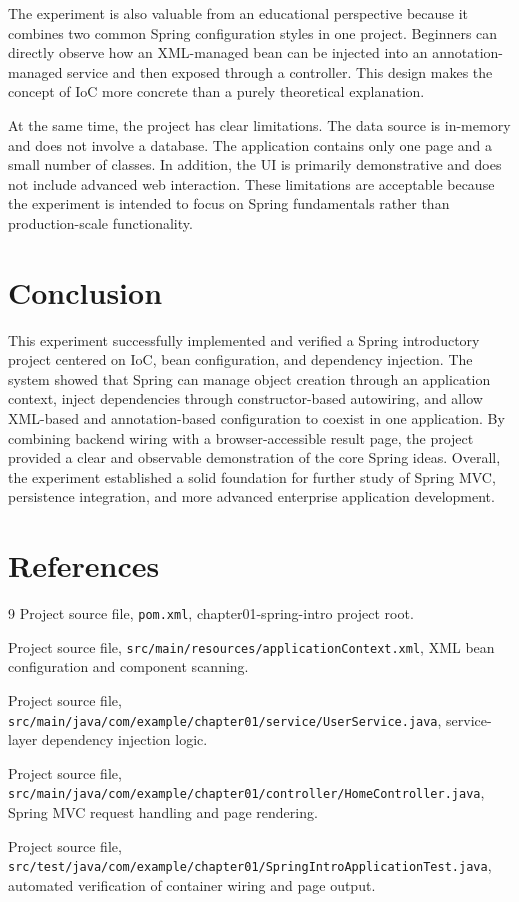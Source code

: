 \documentclass[12pt,a4paper]{article}
\begin{document}
The experiment is also valuable from an educational perspective because it combines two common Spring configuration styles in one project. Beginners can directly observe how an XML-managed bean can be injected into an annotation-managed service and then exposed through a controller. This design makes the concept of IoC more concrete than a purely theoretical explanation.

At the same time, the project has clear limitations. The data source is in-memory and does not involve a database. The application contains only one page and a small number of classes. In addition, the UI is primarily demonstrative and does not include advanced web interaction. These limitations are acceptable because the experiment is intended to focus on Spring fundamentals rather than production-scale functionality.

\section{Conclusion}
This experiment successfully implemented and verified a Spring introductory project centered on IoC, bean configuration, and dependency injection. The system showed that Spring can manage object creation through an application context, inject dependencies through constructor-based autowiring, and allow XML-based and annotation-based configuration to coexist in one application. By combining backend wiring with a browser-accessible result page, the project provided a clear and observable demonstration of the core Spring ideas. Overall, the experiment established a solid foundation for further study of Spring MVC, persistence integration, and more advanced enterprise application development.

\section{References}
\begin{thebibliography}{9}
    Project source file, \texttt{pom.xml}, chapter01-spring-intro project root.

    Project source file, \texttt{src/main/resources/applicationContext.xml}, XML bean configuration and component scanning.

    Project source file, \texttt{src/main/java/com/example/chapter01/service/UserService.java}, service-layer dependency injection logic.

    Project source file, \texttt{src/main/java/com/example/chapter01/controller/HomeController.java}, Spring MVC request handling and page rendering.

    Project source file, \texttt{src/test/java/com/example/chapter01/SpringIntroApplicationTest.java}, automated verification of container wiring and page output.
\end{thebibliography}
\end{document}
